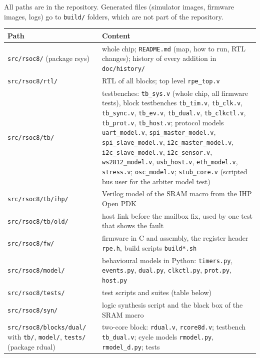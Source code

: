 \documentclass[10pt,a4paper]{article}
\begin{document}
All paths are in the repository. Generated files (simulator images, firmware images, logs) go to
\texttt{build/} folders, which are not part of the repository.

\begin{table}[H]
\centering\small
\begin{tabularx}{\linewidth}{@{}lL@{}}
\toprule
Path & Content \\
\midrule
\texttt{src/rsoc8/} (package rsys) & whole chip; \texttt{README.md} (map, how to run, RTL changes); history of every addition in \texttt{doc/history/} \\
\texttt{src/rsoc8/rtl/} & RTL of all blocks; top level \texttt{rpe\_top.v} \\
\texttt{src/rsoc8/tb/} & testbenches: \texttt{tb\_sys.v} (whole chip, all firmware tests), block testbenches \texttt{tb\_tim.v}, \texttt{tb\_clk.v}, \texttt{tb\_sync.v}, \texttt{tb\_ev.v}, \texttt{tb\_dual.v}, \texttt{tb\_clkctl.v}, \texttt{tb\_prot.v}, \texttt{tb\_host.v}; protocol models \texttt{uart\_model.v}, \texttt{spi\_master\_model.v}, \texttt{spi\_slave\_model.v}, \texttt{i2c\_master\_model.v}, \texttt{i2c\_slave\_model.v}, \texttt{i2c\_sensor.v}, \texttt{ws2812\_model.v}, \texttt{usb\_host.v}, \texttt{eth\_model.v}, \texttt{stress.v}; \texttt{osc\_model.v}; \texttt{stub\_core.v} (scripted bus user for the arbiter model test) \\
\texttt{src/rsoc8/tb/ihp/} & Verilog model of the SRAM macro from the IHP Open PDK \\
\texttt{src/rsoc8/tb/old/} & host link before the mailbox fix, used by one test that shows the fault \\
\texttt{src/rsoc8/fw/} & firmware in C and assembly, the register header \texttt{rpe.h}, build scripts \texttt{build*.sh} \\
\texttt{src/rsoc8/model/} & behavioural models in Python: \texttt{timers.py}, \texttt{events.py}, \texttt{dual.py}, \texttt{clkctl.py}, \texttt{prot.py}, \texttt{host.py} \\
\texttt{src/rsoc8/tests/} & test scripts and suites (table below) \\
\texttt{src/rsoc8/syn/} & logic synthesis script and the black box of the SRAM macro \\
\texttt{src/rsoc8/blocks/dual/} with \texttt{tb/}, \texttt{model/}, \texttt{tests/} (package rdual) & two-core block: \texttt{rdual.v}, \texttt{rcore8d.v}; testbench \texttt{tb\_dual.v}; cycle models \texttt{rmodel.py}, \texttt{rmodel\_d.py}; tests \\

\end{tabularx}
\end{table}
\end{document}
